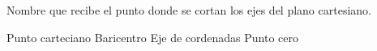 
\question Nombre que recibe el punto donde se cortan los ejes del plano
          cartesiano.

  \begin{oneparchoices}
    \CorrectChoice Punto carteciano
    \choice Baricentro
    \choice Eje de cordenadas
    \choice Punto cero
  \end{oneparchoices}
  \answerline[A]
